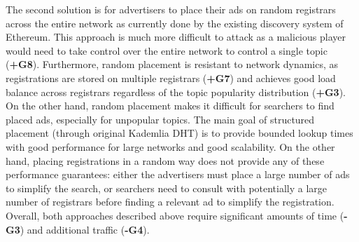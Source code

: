 The second solution is for advertisers to place their ads on random registrars across the entire network as currently done by the existing discovery system of Ethereum. This approach is much more difficult to attack as a malicious player would need to take control over the entire network to control a single topic (\textbf{+G8}). Furthermore, random placement is resistant to network dynamics, as registrations are stored on multiple registrars (\textbf{+G7}) and achieves good load balance across registrars regardless of the topic popularity distribution (\textbf{+G3}). On the other hand, random placement makes it difficult for searchers to find placed ads, especially for unpopular topics. The main goal of structured placement (through original Kademlia DHT) is to provide bounded lookup times with good performance for large networks and good scalability. On the other hand, placing registrations in a random way does not provide any of these performance guarantees: either the advertisers must place a large number of ads to simplify the search, or searchers need to consult with potentially a large number of registrars before finding a relevant ad to simplify the registration. Overall, both approaches described above require significant amounts of time (\textbf{-G3}) and additional traffic (\textbf{-G4}).
